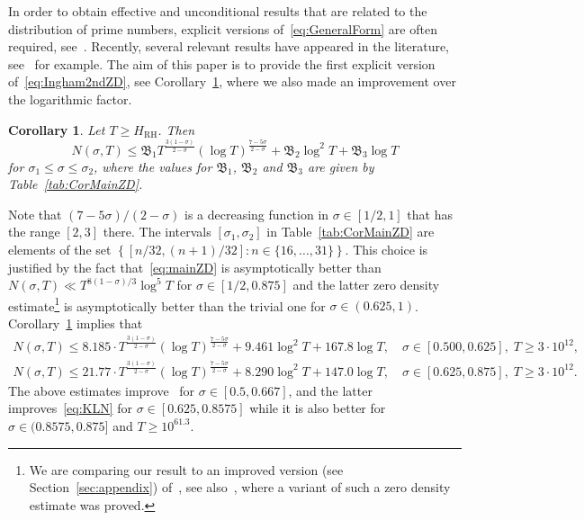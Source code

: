 \documentclass[a4paper,reqno]{amsart}
\newtheorem{corollary}{Corollary}
\theoremstyle{definition}
\begin{document}
In order to obtain effective and unconditional results that are related to the distribution of prime numbers, explicit versions of~\eqref{eq:GeneralForm} are often required, see~\cite{fiori2023sharper,johnston2023some,CullyJohnstonRvM,CullyJohnstonRvMII}. Recently, several relevant results have appeared in the literature, see~\cite{Kadiri2013,KADIRI201822,bellotti2024explicit,chourasiya2024explicit} for example. The aim of this paper is to provide the first explicit version of~\eqref{eq:Ingham2ndZD}, see Corollary~\ref{cor:mainZD}, where we also made an improvement over the logarithmic factor.

\begin{corollary}
\label{cor:mainZD}
Let $T\geq H_{\mathrm{RH}}$. Then
\begin{equation}
\label{eq:mainZD}
N(\sigma,T) \leq \mathfrak{B}_1 T^{\frac{3(1-\sigma)}{2-\sigma}}\left(\log{T}\right)^{\frac{7-5\sigma}{2-\sigma}} + \mathfrak{B}_2 \log^{2}{T} + \mathfrak{B}_3 \log{T}
\end{equation}
for $\sigma_1\leq\sigma\leq\sigma_2$, where the values for $\mathfrak{B}_1$, $\mathfrak{B}_2$ and $\mathfrak{B}_3$ are given by Table~\ref{tab:CorMainZD}.
\end{corollary}

Note that $(7-5\sigma)/(2-\sigma)$ is a decreasing function in $\sigma\in[1/2,1]$ that has the range $[2,3]$ there. The intervals $[\sigma_1,\sigma_2]$ in Table~\ref{tab:CorMainZD} are elements of the set $\left\{[n/32,(n+1)/32]\colon n\in\{16,\ldots,31\}\right\}$. This choice is justified by the fact that~\eqref{eq:mainZD} is asymptotically better than $N(\sigma,T)\ll T^{8(1-\sigma)/3}\log^{5}{T}$ for $\sigma\in[1/2,0.875]$ and the latter zero density estimate\footnote{We are comparing our result to an improved version (see Section~\ref{sec:appendix}) of~\cite[Theorem~1.1 and Table~1]{KADIRI201822}, see also~\cite[Lemma~7.1]{CullyJohnstonRvM}, where a variant of such a zero density estimate was proved.} is asymptotically better than the trivial one for $\sigma\in(0.625,1)$. Corollary~\ref{cor:mainZD} implies that 
\begin{gather*}
N(\sigma,T) \leq 8.185\cdot T^{\frac{3(1-\sigma)}{2-\sigma}}\left(\log{T}\right)^{\frac{7-5\sigma}{2-\sigma}} + 9.461\log^{2}{T} + 167.8\log{T}, \quad \sigma\in[0.500,0.625],\; T\geq 3\cdot10^{12}, \\
N(\sigma,T) \leq 21.77\cdot T^{\frac{3(1-\sigma)}{2-\sigma}}\left(\log{T}\right)^{\frac{7-5\sigma}{2-\sigma}} + 8.290\log^{2}{T} + 147.0\log{T}, \quad \sigma\in[0.625,0.875],\; T\geq 3\cdot10^{12}.
\end{gather*}
The above estimates improve~\cite[Theorem~1.1 and Table~1]{chourasiya2024explicit} for $\sigma\in[0.5, 0.667]$, and the latter improves~\eqref{eq:KLN} for $\sigma\in[0.625,0.8575]$ while it is also better for $\sigma\in(0.8575,0.875]$ and $T\geq 10^{61.3}$.
\end{document}
